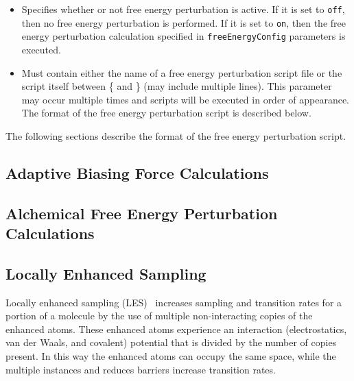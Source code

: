 \begin{itemize}

\item
{}
{Specifies whether or not free energy perturbation is active.  If it 
is set to {\tt off}, then no free energy perturbation is performed.  
If it is set to {\tt on}, then the free energy perturbation calculation specified in
{\tt freeEnergyConfig} parameters is executed.}

\item
{}
{Must contain either the name of a free energy perturbation script file or the script 
itself between \{ and \} (may include multiple lines).
This parameter may occur multiple times and scripts will be executed
in order of appearance.
The format of the free energy perturbation script is described below.
}

\end{itemize}

The following sections describe the format of the free energy perturbation script.




\subsection{Adaptive Biasing Force Calculations}
\label{section:abf}




\subsection{Alchemical Free Energy Perturbation Calculations}
\label{section:alchemy}




\subsection{Locally Enhanced Sampling}
\label{section:les}

Locally enhanced sampling (LES)~\cite{ROIT91,SIMM98,SIMM00} increases
sampling and transition rates for a portion of a molecule by the use of
multiple non-interacting copies of the enhanced atoms.  These enhanced
atoms experience an interaction (electrostatics, van der Waals, and
covalent) potential that is divided by the number of copies present.
In this way the enhanced atoms can occupy the same space, while the
multiple instances and reduces barriers increase transition rates.

